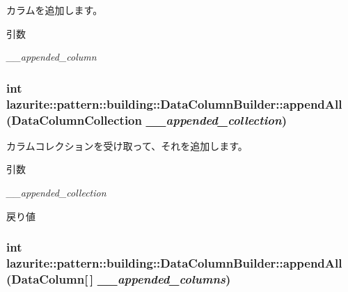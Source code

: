 カラムを追加します。 
\begin{DoxyParams}{引数}
\item[{\em \_\-\_\-appended\_\-column}]\end{DoxyParams}
\hypertarget{classlazurite_1_1pattern_1_1building_1_1_data_column_builder_ab10387e649e0b7adf345ab094c80b3ae}{
\subsubsection[{appendAll}]{\setlength{\rightskip}{0pt plus 5cm}int lazurite::pattern::building::DataColumnBuilder::appendAll (DataColumnCollection {\em \_\-\_\-appended\_\-collection})}}
\label{classlazurite_1_1pattern_1_1building_1_1_data_column_builder_ab10387e649e0b7adf345ab094c80b3ae}


カラムコレクションを受け取って、それを追加します。 
\begin{DoxyParams}{引数}
\item[{\em \_\-\_\-appended\_\-collection}]\end{DoxyParams}
\begin{DoxyReturn}{戻り値}

\end{DoxyReturn}
\hypertarget{classlazurite_1_1pattern_1_1building_1_1_data_column_builder_a67f27556356cd162a8c1d4054156389a}{
\subsubsection[{appendAll}]{\setlength{\rightskip}{0pt plus 5cm}int lazurite::pattern::building::DataColumnBuilder::appendAll (DataColumn\mbox{[}$\,$\mbox{]} {\em \_\-\_\-appended\_\-columns})}}
\label{classlazurite_1_1pattern_1_1building_1_1_data_column_builder_a67f27556356cd162a8c1d4054156389a}


